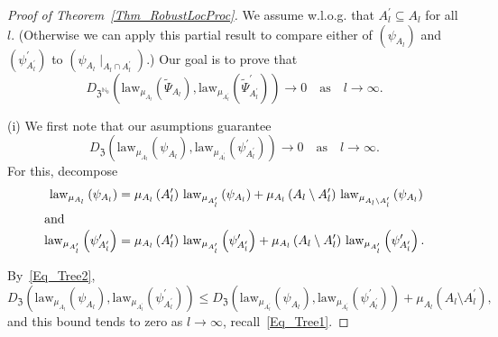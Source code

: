 \documentclass[10pt]{amsart}
\theoremstyle{definition}\newtheorem{defi}[theo]{Definition}\newtheorem{rema}[theo]{Remark}\newtheorem{exam}[theo]{Example}\newtheorem{exem}[theo]{Example}\newtheorem{nota}[theo]{Notation}
\newcommand{\law}{\mathrm{law}}
\newcommand{\frkZ}{\mathfrak{Z}}
\newcommand{\bbN}{\mathbb{N}}
\begin{document}
\begin{proof}[{Proof of Theorem~\ref{Thm_RobustLocProc}}]
We assume w.l.o.g. that $A_{l}^{\prime}\subseteq A_{l}$ for all $l$. (Otherwise we can apply this partial result to compare either of $(\psi_{A_{l}})$ and $(\psi_{A_{l} ^{\prime}}^{\prime})$ to $(\psi_{A_{l}}\mid_{A_{l}\cap A_{l}^{\prime}})$.) Our goal is to prove that
\begin{equation}\label{Eq_RobustLocProcMetric}
D_{\frkZ^{\bbN_{0}}}\left(\law_{\mu_{A_{l}}}\left(\widetilde{\Psi }_{A_{l}}\right),\law_{\mu_{A_{l}^{\prime}}}\left(\widetilde{\Psi}_{A_{l} ^{\prime}}^{\prime}\right)\right)\longrightarrow0\quad\text{as}\quad l\rightarrow
\infty. 
\end{equation}

\noindent (i) We first note that our asumptions guarantee
\begin{equation}\label{Eq_idimRobust}
D_{\frkZ}\left(\law_{\mu_{A_{l}}}\left(\psi_{A_{l}}\right),\law _{\mu_{A_{l}^{\prime}}}\left(\psi_{A_{l}^{\prime}}^{\prime}\right)\right)\longrightarrow0\quad \text{as}\quad l\rightarrow\infty. 
\end{equation}
For this, decompose
\begin{align*}
\law_{\mu_{A_{l}}}\left(\psi_{A_{l}}\right)&=\mu_{A_{l} }\left(A_{l}^{\prime}\right)\,\law_{\mu_{A_{l}^{\prime}}}\left(\psi_{A_{l}}\right)+\mu_{A_{l}}\left(A_{l}\setminus A_{l}^{\prime}\right)\,\law_{\mu_{A_{l}
\setminus A_{l}^{\prime}}}\left(\psi_{A_{l}}\right)\\
 \intertext{and}
 \law_{\mu _{A_{l}^{\prime}}}\left(\psi_{A_{l}^{\prime}}^{\prime}\right)&=\mu_{A_{l}}\left(A_{l}^{\prime }\right)\,\law_{\mu_{A_{l}^{\prime}}}\left(\psi_{A_{l}^{\prime}}^{\prime}\right)+\mu_{A_{l}}\left(A_{l}\setminus A_{l}^{\prime}\right)\,\law_{\mu_{A_{l} ^{\prime}}}\left(\psi_{A_{l}^{\prime}}^{\prime}\right).
\end{align*}

By~\eqref{Eq_Tree2},
\[
D_{\frkZ}\left(\law_{\mu_{A_{l}}}\left(\psi_{A_{l}}\right),\law _{\mu_{A_{l}^{\prime}}}\left(\psi_{A_{l}^{\prime}}^{\prime}\right)\right)\leq D_{\frkZ }\left(\law_{\mu_{A_{l}^{\prime}}}\left(\psi_{A_{l}}\right),\law_{\mu _{A_{l}^{\prime}}}\left(\psi_{A_{l}^{\prime}}^{\prime}\right)\right)+\mu_{A_{l}}\left(A_{l}\setminus A_{l}^{\prime}\right),
\]
and this bound tends to zero as $l\rightarrow\infty$, recall~\eqref{Eq_Tree1}.


\end{proof}
\end{document}

